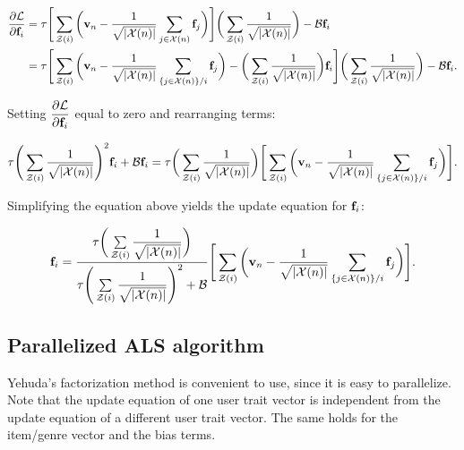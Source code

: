 \documentclass{article}
\begin{document}
\begin{equation}
    \begin{split}
        \dfrac{\partial \mathcal{L}}{\partial \vb{f}_i} &= \tau \Bigg[ \sum\limits_{\mathcal{Z}(i)} \bigg(\vb{v}_{n} - \dfrac{1}{\sqrt{|\mathcal{X}(n)|}} \sum\limits_{j \in \mathcal{X}(n)} \vb{f}_j\bigg) \Bigg] \bigg( \sum\limits_{\mathcal{Z}(i)} \dfrac{1}{\sqrt{|\mathcal{X}(n)|}} \bigg)- \mathcal{B} \vb{f}_i \\
                                                          &= \tau \Bigg[ \sum\limits_{\mathcal{Z}(i)} \bigg(\vb{v}_{n} - \dfrac{1}{\sqrt{|\mathcal{X}(n)|}} \sum\limits_{\{j \in \mathcal{X}(n)\}/i} \vb{f}_j \bigg) 
                                                          - \bigg( \sum\limits_{\mathcal{Z}(i)} \dfrac{1}{\sqrt{|\mathcal{X}(n)|}}\bigg) \vb{f}_i \Bigg]\bigg( \sum\limits_{\mathcal{Z}(i)} \dfrac{1}{\sqrt{|\mathcal{X}(n)|}} \bigg) - \mathcal{B} \vb{f}_i \text{.}
    \end{split}
\end{equation}

Setting $\dfrac{\partial \mathcal{L}}{\partial \vb{f}_i}$ equal to zero and rearranging terms:

\[
    \tau \Bigg(\sum\limits_{\mathcal{Z}(i)}\dfrac{1}{\sqrt{|\mathcal{X}(n)|}}\Bigg)^2 \vb{f}_i + \mathcal{B} \vb{f}_i 
    = \tau \bigg( \sum\limits_{\mathcal{Z}(i)} \dfrac{1}{\sqrt{|\mathcal{X}(n)|}} \bigg) \Bigg[ \sum\limits_{\mathcal{Z}(i)} \bigg( \vb{v}_{n} - \dfrac{1}{\sqrt{|\mathcal{X}(n)|}} \sum\limits_{\{j \in \mathcal{X}(n)\}/i} \vb{f}_j \bigg) \Bigg]\text{.}
\]

Simplifying the equation above yields the update equation for $\vb{f}_i$:

\begin{equation}
    \begin{split}
        \vb{f}_i = \dfrac{\tau \bigg( \sum\limits_{\mathcal{Z}(i)} \dfrac{1}{\sqrt{|\mathcal{X}(n)|}} \bigg)}{\tau \Bigg(\sum\limits_{\mathcal{Z}(i)}\dfrac{1}{\sqrt{|\mathcal{X}(n)|}}\Bigg)^2 + \mathcal{B}} \Bigg[ \sum\limits_{\mathcal{Z}(i)} \bigg( \vb{v}_{n} - \dfrac{1}{\sqrt{|\mathcal{X}(n)|}} \sum\limits_{\{j \in \mathcal{X}(n)\}/i} \vb{f}_j \bigg) \Bigg]\text{.}
    \end{split}
\end{equation}

\newpage

\subsection{Parallelized ALS algorithm}
Yehuda's factorization method is convenient to use, since it is easy to parallelize.
Note that the update equation of one user trait vector is independent from the
update equation of a different user trait vector.
The same holds for the item/genre vector and the bias terms.
\end{document}
